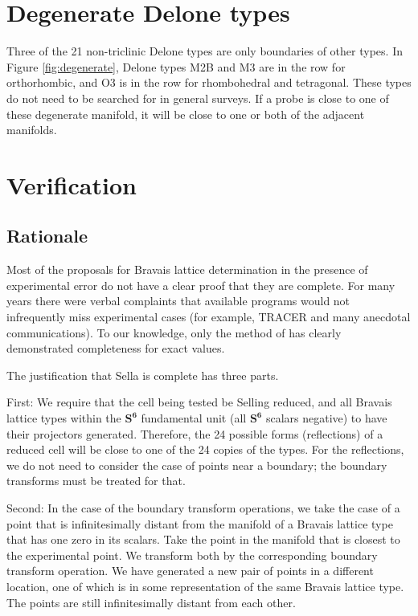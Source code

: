 \documentclass[preprint]{iucr}              %
\newcommand{\SVI}[0]{$\mathbf{S^{6}}$}
\begin{document}
	\section{Degenerate Delone types}
	
	Three of the 21 non-triclinic Delone types are only boundaries of other types. In Figure 
	\ref{fig:degenerate}, Delone types M2B and M3 are in the row for orthorhombic, and
	O3 is in the row for rhombohedral and tetragonal. These types do not need to
	be searched for in general surveys. If a probe is close to 
	one of these degenerate manifold, it will be close to one
	or both of the adjacent manifolds.
	
	\section{Verification}
	
	\subsection{Rationale}
	
	Most of the proposals for Bravais lattice determination in the 
	presence of experimental error do not have a clear proof that 
	they are complete. For many years there were verbal complaints 
	that available programs would not infrequently miss experimental 
	cases (for example, TRACER \cite{lawton1965} and many anecdotal 
	communications).  To our knowledge, only the method of 
	\cite{OishiTomiyasu2012} has clearly demonstrated completeness
	for exact values.	
	
	The justification that Sella is complete has three parts.
	
	First: We require that the cell being tested be Selling reduced, and
	all Bravais lattice types within the \SVI{} fundamental unit (all
	\SVI{} scalars negative) to have their projectors generated. Therefore,
	the 24 possible forms (reflections) of a 
	reduced cell will be close to one of the 24 copies of the types. 
	For the reflections, we do not need to consider the case of 
	points near a boundary; the boundary 
	transforms must be treated for that.
	
	Second: In the case of the boundary transform operations, 
	we take the case of a point that is infinitesimally distant from the manifold of a 
	Bravais lattice type that has one zero in its scalars. Take 
	the point in the manifold that is closest to the experimental 
	point. We transform both by the corresponding boundary transform 
	operation. We have generated a new pair of points in a 
	different location, one of which is in some representation of 
	the same Bravais lattice type. The points are still 
	infinitesimally distant from each other.
	
\end{document}
